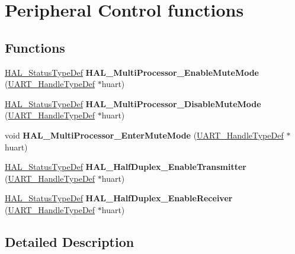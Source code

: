 \hypertarget{group___u_a_r_t___exported___functions___group3}{}\section{Peripheral Control functions}
\label{group___u_a_r_t___exported___functions___group3}
\subsection*{Functions}
\begin{DoxyCompactItemize}
\item 
\mbox{\label{group___u_a_r_t___exported___functions___group3_gad1e8ba15af5c8b25fd9eb31b9c85dfac}} 
\hyperlink{stm32f0xx__hal__def_8h_a63c0679d1cb8b8c684fbb0632743478f}{H\+A\+L\+\_\+\+Status\+Type\+Def} {\bfseries H\+A\+L\+\_\+\+Multi\+Processor\+\_\+\+Enable\+Mute\+Mode} (\hyperlink{struct_u_a_r_t___handle_type_def}{U\+A\+R\+T\+\_\+\+Handle\+Type\+Def} $\ast$huart)
\item 
\mbox{\label{group___u_a_r_t___exported___functions___group3_ga60e23409c6c4039dd71a45e41c69654f}} 
\hyperlink{stm32f0xx__hal__def_8h_a63c0679d1cb8b8c684fbb0632743478f}{H\+A\+L\+\_\+\+Status\+Type\+Def} {\bfseries H\+A\+L\+\_\+\+Multi\+Processor\+\_\+\+Disable\+Mute\+Mode} (\hyperlink{struct_u_a_r_t___handle_type_def}{U\+A\+R\+T\+\_\+\+Handle\+Type\+Def} $\ast$huart)
\item 
\mbox{\label{group___u_a_r_t___exported___functions___group3_ga62b7a4ce64c678a3a79d747fe3f50883}} 
void {\bfseries H\+A\+L\+\_\+\+Multi\+Processor\+\_\+\+Enter\+Mute\+Mode} (\hyperlink{struct_u_a_r_t___handle_type_def}{U\+A\+R\+T\+\_\+\+Handle\+Type\+Def} $\ast$huart)
\item 
\mbox{\label{group___u_a_r_t___exported___functions___group3_ga58d73e260a5536fb9cb40d7d2fe2b4bb}} 
\hyperlink{stm32f0xx__hal__def_8h_a63c0679d1cb8b8c684fbb0632743478f}{H\+A\+L\+\_\+\+Status\+Type\+Def} {\bfseries H\+A\+L\+\_\+\+Half\+Duplex\+\_\+\+Enable\+Transmitter} (\hyperlink{struct_u_a_r_t___handle_type_def}{U\+A\+R\+T\+\_\+\+Handle\+Type\+Def} $\ast$huart)
\item 
\mbox{\label{group___u_a_r_t___exported___functions___group3_ga396ebbcdbe352c3393ad3007614383ac}} 
\hyperlink{stm32f0xx__hal__def_8h_a63c0679d1cb8b8c684fbb0632743478f}{H\+A\+L\+\_\+\+Status\+Type\+Def} {\bfseries H\+A\+L\+\_\+\+Half\+Duplex\+\_\+\+Enable\+Receiver} (\hyperlink{struct_u_a_r_t___handle_type_def}{U\+A\+R\+T\+\_\+\+Handle\+Type\+Def} $\ast$huart)
\end{DoxyCompactItemize}


\subsection{Detailed Description}

